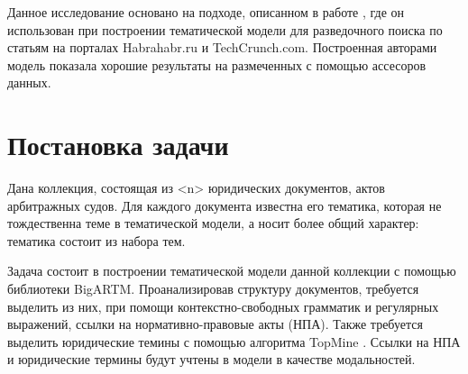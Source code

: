 \documentclass[12pt,twoside]{article}
\begin{document}





Данное исследование основано на подходе, описанном в работе \cite{Ianina_2017}, где он использован при построении тематической модели для разведочного поиска по статьям на порталах Habrahabr.ru и TechCrunch.com. Построенная авторами модель показала хорошие результаты на размеченных с помощью ассесоров данных.

\section{Постановка задачи}

Дана коллекция, состоящая из <n> юридических документов, актов арбитражных судов. Для каждого документа известна его тематика, которая не тождественна теме в тематической модели, а носит более общий характер: тематика состоит из набора тем.

Задача состоит в построении тематической модели данной коллекции с помощью библиотеки BigARTM. Проанализировав структуру документов, требуется выделить из них, при помощи контекстно-свободных грамматик и регулярных выражений, ссылки на нормативно-правовые акты (НПА). Также требуется выделить юридические темины с помощью алгоритма TopMine \cite{El-Kishky2014}. Ссылки на НПА и юридические термины будут учтены в модели в качестве модальностей.

\end{document}
